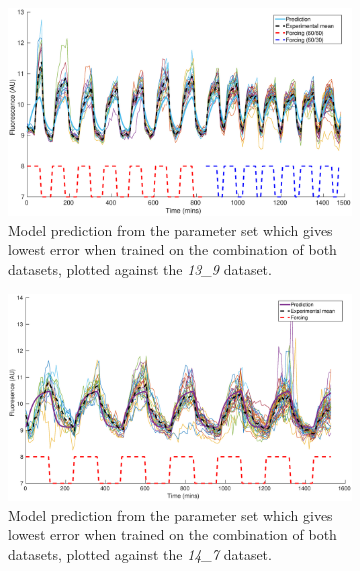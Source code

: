 \documentclass[10pt,journal]{./IEEE_latex_class/IEEEtran}
\begin{document}
\begin{figure}[H]
    \begin{subfigure}[c]{\textwidth}
    \centering
        \includegraphics[scale = 0.3]{13_9_14_7_with_13_9_bestplot}
        \caption{Model prediction from the parameter set which gives lowest error when trained on the combination of both datasets, plotted against the  \textit{13\_9} dataset. }
    \end{subfigure}
    
    \begin{subfigure}[c]{\textwidth}
    \centering
        \includegraphics[scale = 0.3]{13_9_14_7_with_14_7_bestplot}
        \caption{Model prediction from the parameter set which gives lowest error when trained on the combination of both datasets, plotted against the  \textit{14\_7} dataset.}
    \end{subfigure}
    \caption{}
\label{hist_f}
\end{figure}

\clearpage
\end{document}
